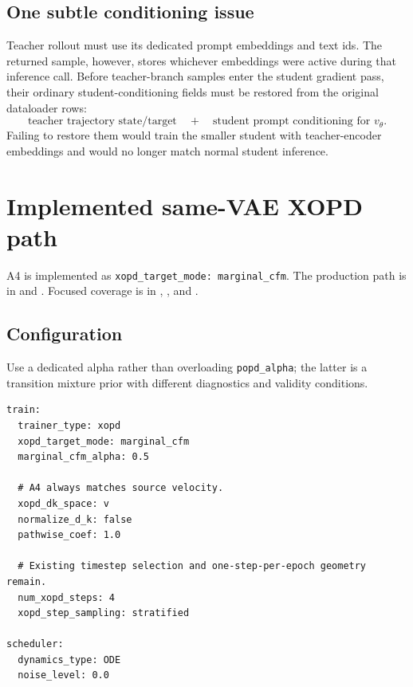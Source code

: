 \documentclass[11pt,a4paper]{article}
\theoremstyle{plain}
\theoremstyle{definition}
\begin{document}
\subsection{One subtle conditioning issue}

Teacher rollout must use its dedicated prompt embeddings and text ids.  The returned sample,
however, stores whichever embeddings were active during that inference call.  Before
teacher-branch samples enter the student gradient pass, their ordinary student-conditioning
fields must be restored from the original dataloader rows:
\begin{equation}
\text{teacher trajectory state/target}
\quad+\quad
\text{student prompt conditioning for }v_\theta.
\label{eq:conditioning-separation}
\end{equation}
Failing to restore them would train the smaller student with teacher-encoder embeddings and would
no longer match normal student inference.

\section{Implemented same-VAE XOPD path}
\label{sec:implementation}

\begin{tcolorbox}[colback=green!5,colframe=green!50!black,title=Status]
\raggedright
A4 is implemented as \texttt{xopd\_target\_mode: marginal\_cfm}.
The production path is in  and
.
Focused coverage is in ,
, and .
\end{tcolorbox}

\subsection{Configuration}

Use a dedicated alpha rather than overloading \texttt{popd\_alpha}; the latter is a transition
mixture prior with different diagnostics and validity conditions.

\begin{lstlisting}[style=yaml,caption={Implemented same-VAE A4 configuration.}]
train:
  trainer_type: xopd
  xopd_target_mode: marginal_cfm
  marginal_cfm_alpha: 0.5

  # A4 always matches source velocity.
  xopd_dk_space: v
  normalize_d_k: false
  pathwise_coef: 1.0

  # Existing timestep selection and one-step-per-epoch geometry remain.
  num_xopd_steps: 4
  xopd_step_sampling: stratified

scheduler:
  dynamics_type: ODE
  noise_level: 0.0
\end{lstlisting}
\end{document}
